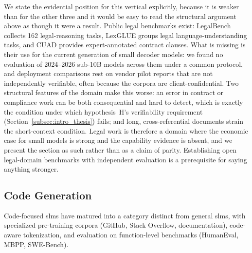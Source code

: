 We state the evidential position for this vertical explicitly, because it is
weaker than for the other three and it would be easy to read the structural
argument above as though it were a result. Public legal benchmarks exist: LegalBench
\citep{guha2023legalbench} collects 162 legal-reasoning tasks, LexGLUE
\citep{chalkidis2022lexglue} groups legal language-understanding tasks, and CUAD
\citep{hendrycks2021cuad} provides expert-annotated contract clauses. What is
missing is their use for the current generation of small decoder models: we
found no evaluation of 2024--2026 sub-10B models across them under a common
protocol, and deployment comparisons rest on vendor pilot reports that are not
independently verifiable, often because the corpora are client-confidential. Two structural
features of the domain make this worse: an error in contract or compliance work
can be both consequential and hard to detect, which is exactly the condition
under which hypothesis~H's verifiability requirement (Section~\ref{subsec:intro_thesis})
fails; and long, cross-referential documents strain the short-context condition.
Legal work is therefore a domain where the economic case for small models is
strong and the capability evidence is absent, and we present the section as such
rather than as a claim of parity. Establishing open legal-domain benchmarks with
independent evaluation is a prerequisite for saying anything stronger.

\subsection{Code Generation}
\label{subsec:applications_code}

Code-focused \glspl{slm} have matured into a category distinct from general \glspl{slm}, with specialized pre-training corpora (GitHub, Stack Overflow, documentation), code-aware tokenization, and evaluation on function-level benchmarks (HumanEval, MBPP, SWE-Bench).

